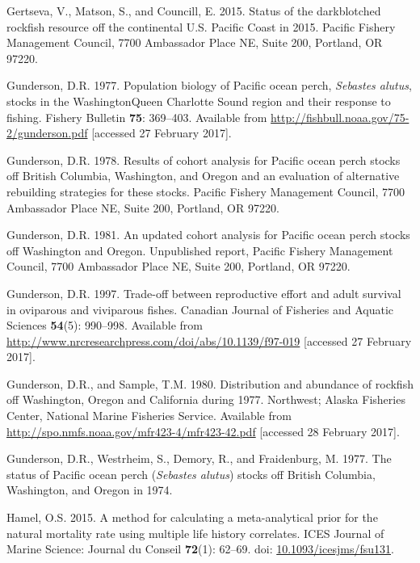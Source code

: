 \documentclass[12pt,]{article}
\begin{document}
\hypertarget{ref-gertseva_status_2015}{}
Gertseva, V., Matson, S., and Councill, E. 2015. Status of the
darkblotched rockfish resource off the continental U.S. Pacific Coast in
2015. Pacific Fishery Management Council, 7700 Ambassador Place NE,
Suite 200, Portland, OR 97220.

\hypertarget{ref-gunderson_population_1977}{}
Gunderson, D.R. 1977. Population biology of Pacific ocean perch,
\emph{Sebastes alutus}, stocks in the WashingtonQueen Charlotte Sound
region and their response to fishing. Fishery Bulletin \textbf{75}:
369--403. Available from
\url{http://fishbull.noaa.gov/75-2/gunderson.pdf} {[}accessed 27
February 2017{]}.

\hypertarget{ref-gunderson_results_1978}{}
Gunderson, D.R. 1978. Results of cohort analysis for Pacific ocean perch
stocks off British Columbia, Washington, and Oregon and an evaluation of
alternative rebuilding strategies for these stocks. Pacific Fishery
Management Council, 7700 Ambassador Place NE, Suite 200, Portland, OR
97220.

\hypertarget{ref-gunderson_updated_1981}{}
Gunderson, D.R. 1981. An updated cohort analysis for Pacific ocean perch
stocks off Washington and Oregon. Unpublished report, Pacific Fishery
Management Council, 7700 Ambassador Place NE, Suite 200, Portland, OR
97220.

\hypertarget{ref-gunderson_trade-off_1997}{}
Gunderson, D.R. 1997. Trade-off between reproductive effort and adult
survival in oviparous and viviparous fishes. Canadian Journal of
Fisheries and Aquatic Sciences \textbf{54}(5): 990--998. Available from
\url{http://www.nrcresearchpress.com/doi/abs/10.1139/f97-019}
{[}accessed 27 February 2017{]}.

\hypertarget{ref-gunderson_distribution_1980}{}
Gunderson, D.R., and Sample, T.M. 1980. Distribution and abundance of
rockfish off Washington, Oregon and California during 1977. Northwest;
Alaska Fisheries Center, National Marine Fisheries Service. Available
from \url{http://spo.nmfs.noaa.gov/mfr423-4/mfr423-42.pdf} {[}accessed
28 February 2017{]}.

\hypertarget{ref-gunderson_status_1977}{}
Gunderson, D.R., Westrheim, S., Demory, R., and Fraidenburg, M. 1977.
The status of Pacific ocean perch (\emph{Sebastes alutus}) stocks off
British Columbia, Washington, and Oregon in 1974.

\hypertarget{ref-hamel_method_2015}{}
Hamel, O.S. 2015. A method for calculating a meta-analytical prior for
the natural mortality rate using multiple life history correlates. ICES
Journal of Marine Science: Journal du Conseil \textbf{72}(1): 62--69.
doi:
\href{https://doi.org/10.1093/icesjms/fsu131}{10.1093/icesjms/fsu131}.
\end{document}

